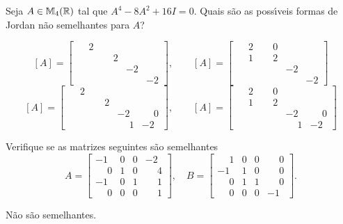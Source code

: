 \documentclass[12pt]{exam}
\begin{document}
\begin{exercicio}
  Seja $A \in \mathbb{M}_4(\mathbb{R})$ tal que $A^4 - 8A^2 + 16I = 0$. Quais s\~ao as poss{\'\i}veis formas de Jordan n\~ao semelhantes para $A$?
  \begin{solucao}
    \[
      [A] = \begin{bmatrix}
        \phantom{-}2 \\
        & \phantom{-}2 \\
        & & -2\\
        & & & -2
      \end{bmatrix},\qquad [A] = \begin{bmatrix}
        \phantom{-}2 & \phantom{-}0\\
        \phantom{-}1& \phantom{-}2 \\
        & & -2\\
        & & & -2
      \end{bmatrix}\]
      \[
      [A] = \begin{bmatrix}
        \phantom{-}2\\
        & \phantom{-}2 \\
        & & -2 & \phantom{-}0\\
        & & \phantom{-}1& -2
      \end{bmatrix},\qquad
      [A] = \begin{bmatrix}
        \phantom{-}2 & \phantom{-}0\\
        \phantom{-}1& \phantom{-}2 \\
        & & -2 & \phantom{-}0\\
        & & \phantom{-}1& -2
      \end{bmatrix}
    \]
  \end{solucao}
\end{exercicio}

\begin{exercicio}
  Verifique se as matrizes seguintes s\~ao semelhantes
  \[
    A = \begin{bmatrix}
      -1 & 0 & 0 & -2\\
      \phantom{-} 0 & 1 & 0 & \phantom{-} 4\\
      -1 & 0 & 1 & \phantom{-} 1\\
      \phantom{-} 0 & 0 & 0 & \phantom{-} 1
    \end{bmatrix}, \quad B = \begin{bmatrix}
      \phantom{-} 1 & 0 & 0 & \phantom{-} 0\\
      -1 & 1 & 0 & \phantom{-} 0\\
      \phantom{-} 0 & 1 & 1 & \phantom{-} 0\\
      \phantom{-} 0 & 0 & 0 & -1
    \end{bmatrix}.
  \]
  \begin{solucao}
    N\~ao s\~ao semelhantes.
  \end{solucao}
\end{exercicio}
\end{document}
